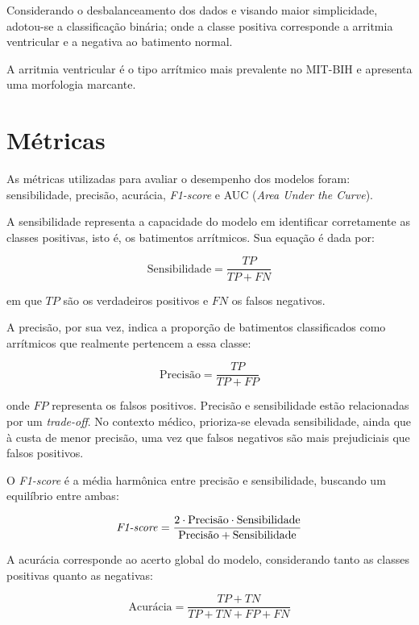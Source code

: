 \documentclass[
    12pt,                %
    openright,           %
    oneside,             %
    a4paper,             %
    brazil               %
]{abntex2}
\begin{document}
Considerando o desbalanceamento dos dados e visando maior simplicidade, adotou-se a classificação binária; onde a classe positiva corresponde a arritmia ventricular e a negativa ao batimento normal.

A arritmia ventricular é o tipo arrítmico mais prevalente no MIT-BIH e apresenta uma morfologia marcante. 


\section{Métricas}
\label{sec:metricas}

As métricas utilizadas para avaliar o desempenho dos modelos foram: sensibilidade, precisão, acurácia, \textit{F1-score} e AUC (\textit{Area Under the Curve}).  

A sensibilidade representa a capacidade do modelo em identificar corretamente as classes positivas, isto é, os batimentos arrítmicos. Sua equação é dada por:

\begin{equation}
\text{Sensibilidade} = \frac{TP}{TP + FN}
\end{equation}

em que $TP$ são os verdadeiros positivos e $FN$ os falsos negativos.  

A precisão, por sua vez, indica a proporção de batimentos classificados como arrítmicos que realmente pertencem a essa classe:

\begin{equation}
\text{Precisão} = \frac{TP}{TP + FP}
\end{equation}

onde $FP$ representa os falsos positivos. Precisão e sensibilidade estão relacionadas por um \textit{trade-off}. No contexto médico, prioriza-se elevada sensibilidade, ainda que à custa de menor precisão, uma vez que falsos negativos são mais prejudiciais que falsos positivos.  

O \textit{F1-score} é a média harmônica entre precisão e sensibilidade, buscando um equilíbrio entre ambas:

\begin{equation}
\text{\textit{F1-score}} = \frac{2 \cdot \text{Precisão} \cdot \text{Sensibilidade}}{\text{Precisão} + \text{Sensibilidade}}
\end{equation}

A acurácia corresponde ao acerto global do modelo, considerando tanto as classes positivas quanto as negativas:

\begin{equation}
\text{Acurácia} = \frac{TP + TN}{TP + TN + FP + FN}
\end{equation}
\end{document}

